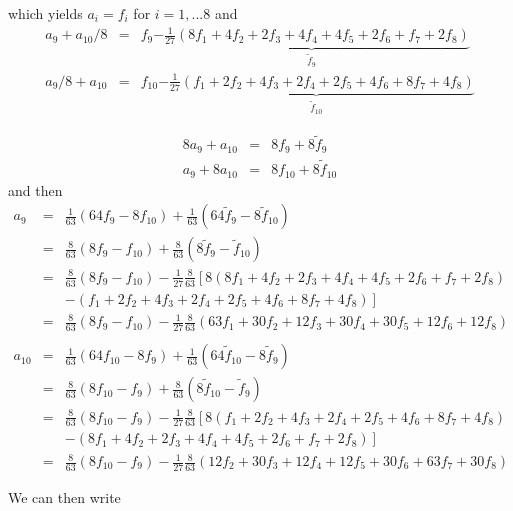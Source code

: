 which yields $a_i=f_i$ for $i=1,...8$ and 
\begin{eqnarray}
a_9 + a_{10}/8 &=& f_9\underbrace{-\frac{1}{27} (8f_1 + 4f_2 + 2f_3 +4f_4 + 4f_5 + 2f_6 + f_7 +2f_8)}_{\tilde{f}_9}   
\nonumber\\
a_9/8 + a_{10} &=& f_{10}
\underbrace{-\frac{1}{27} (f_1 + 2f_2 + 4f_3 +2f_4 + 2f_5 + 4f_6 + 8f_7 +4f_8)}_{\tilde{f}_{10}} 
\nonumber
\end{eqnarray}

\begin{eqnarray}
8a_9 + a_{10} &=& 8f_9 + 8\tilde{f}_9  \nonumber\\
a_9 + 8a_{10} &=& 8f_{10} +8\tilde{f}_{10}
\nonumber
\end{eqnarray}
and then 
\begin{eqnarray}
a_{9}
&=&\frac{1}{63}(64 {f}_{9}-8{f}_{10}) + \frac{1}{63}(64 \tilde{f}_{9}-8\tilde{f}_{10}) \nonumber\\
&=& \frac{8}{63}(8{f}_{9}-{f}_{10})+\frac{8}{63}(8\tilde{f}_{9}-\tilde{f}_{10}) \nonumber\\
&=& \frac{8}{63}(8{f}_{9}-{f}_{10}) -\frac{1}{27}\frac{8}{63}
\left[ 8 (8f_1 + 4f_2 + 2f_3 +4f_4 + 4f_5 + 2f_6 + f_7 +2f_8) \right. \nonumber\\
&& \left. - (f_1 + 2f_2 + 4f_3 +2f_4 + 2f_5 + 4f_6 + 8f_7 +4f_8) \right] \nonumber\\
&=& \frac{8}{63}(8{f}_{9}-{f}_{10}) -\frac{1}{27}\frac{8}{63} 
( 63 f_1 +30 f_2 +12 f_3  +30f_4 +30f_5 +12f_6 +12f_8)\nonumber\\ \nonumber \\
a_{10} 
&=& \frac{1}{63}(64 {f}_{10}-8{f}_9) + \frac{1}{63}(64 \tilde{f}_{10}-8\tilde{f}_9) \nonumber\\
&=& \frac{8}{63}(8 {f}_{10}-{f}_9) + \frac{8}{63}(8 \tilde{f}_{10}-\tilde{f}_9) \nonumber\\
&=& \frac{8}{63}(8 {f}_{10}-{f}_9) -\frac{1}{27}\frac{8}{63} \left[
8(f_1 + 2f_2 + 4f_3 +2f_4 + 2f_5 + 4f_6 + 8f_7 +4f_8) \right. \nonumber\\
&& \left. -(8f_1 + 4f_2 + 2f_3 +4f_4 + 4f_5 + 2f_6 + f_7 +2f_8)
\right] \nonumber\\
&=&\frac{8}{63}(8 {f}_{10}-{f}_9) -\frac{1}{27}\frac{8}{63} 
(12f_2 + 30f_3 + 12f_4 +12f_5 + 30f_6 + 63f_7 +30f_8      ) \nonumber
\end{eqnarray}

We can then write

